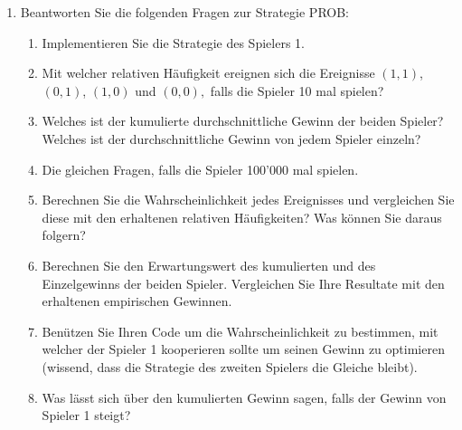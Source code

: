 \documentclass[12pt,a4paper]{article}
\begin{document}
\begin{enumerate}

\item Beantworten Sie die folgenden Fragen zur Strategie PROB: 
\begin{enumerate}
\item Implementieren Sie die Strategie des Spielers 1. 
\item Mit welcher relativen Häufigkeit ereignen sich die Ereignisse $(1, 1)$, $(0, 1)$, $(1, 0)$ und $(0, 0),$ 
falls die Spieler 10 mal spielen?
\item Welches ist der kumulierte durchschnittliche Gewinn der beiden Spieler? Welches ist der durchschnittliche
Gewinn von jedem Spieler einzeln?
\item Die gleichen Fragen, falls die Spieler 100'000 mal spielen. 
\item Berechnen Sie die Wahrscheinlichkeit jedes Ereignisses und vergleichen Sie diese mit den erhaltenen
relativen Häufigkeiten? Was können Sie daraus folgern?
\item Berechnen Sie den Erwartungswert des kumulierten und des Einzelgewinns der beiden Spieler. Vergleichen Sie Ihre Resultate mit den erhaltenen empirischen Gewinnen.
\item Benützen Sie Ihren Code um die Wahrscheinlichkeit zu bestimmen, mit welcher der Spieler 1 kooperieren sollte 
um seinen Gewinn zu optimieren (wissend, dass die Strategie des zweiten Spielers die Gleiche bleibt). 
\item Was lässt sich über den kumulierten Gewinn sagen, falls der Gewinn von Spieler 1 steigt?
\end{enumerate}


\end{enumerate}
\end{document}
